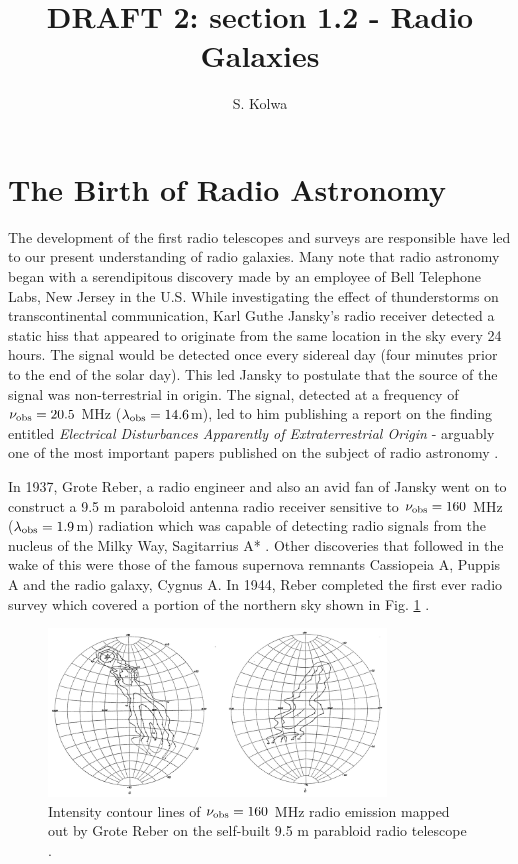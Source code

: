 \documentclass[10pt,a4paper]{article}
\begin{document}
\title{{\bf DRAFT 2:} section 1.2 - Radio Galaxies }
\author{S. Kolwa}
\maketitle

\section{The Birth of Radio Astronomy}\label{section:early-radio-surveys}
The development of the first radio telescopes and surveys are responsible have led to our present understanding of radio galaxies. Many note that radio astronomy began with a serendipitous discovery made by an employee of Bell Telephone Labs, New Jersey in the U.S. While investigating the effect of thunderstorms on transcontinental communication, Karl Guthe Jansky's radio receiver detected a static hiss that appeared to originate from the same location in the sky every 24 hours. The signal would be detected once every sidereal day (four minutes prior to the end of the solar day). This led Jansky to postulate that the source of the signal was non-terrestrial in origin. The signal, detected at a frequency of $\nu_{\rm obs} = 20.5$ MHz ($\lambda_{\rm obs} = 14.6$m), led to him publishing a report on the finding entitled {\it Electrical Disturbances Apparently of Extraterrestrial Origin} - arguably one of the most important papers published on the subject of radio astronomy \citep{Jansky1933b,Jansky1933a}.

In 1937, Grote Reber, a radio engineer and also an avid fan of Jansky went on to construct a 9.5 m paraboloid antenna radio receiver sensitive to $\nu_{\rm obs} = 160$ MHz ($\lambda_{\rm obs} = 1.9$m) radiation which was capable of detecting radio signals from the nucleus of the Milky Way, Sagitarrius A* \citep{Reber1940}. Other discoveries that followed in the wake of this were those of the famous supernova remnants Cassiopeia A, Puppis A and the radio galaxy, Cygnus A. In 1944, Reber completed the first ever radio survey which covered a portion of the northern sky shown in Fig. \ref{fig:Reber-map-sky-1944} \citep{Reber1944}. 

\begin{figure}[!ht]
     \centering
     \includegraphics[width=0.8\textwidth]{plots_chp1/Reber_radiomap_1944.png}
     \caption{Intensity contour lines of $\nu_{\rm obs} = 160$ MHz radio emission mapped out by Grote Reber on the self-built 9.5 m parabloid radio telescope \citep{Reber1944}.}
     \label{fig:Reber-map-sky-1944}
\end{figure}
\end{document}
